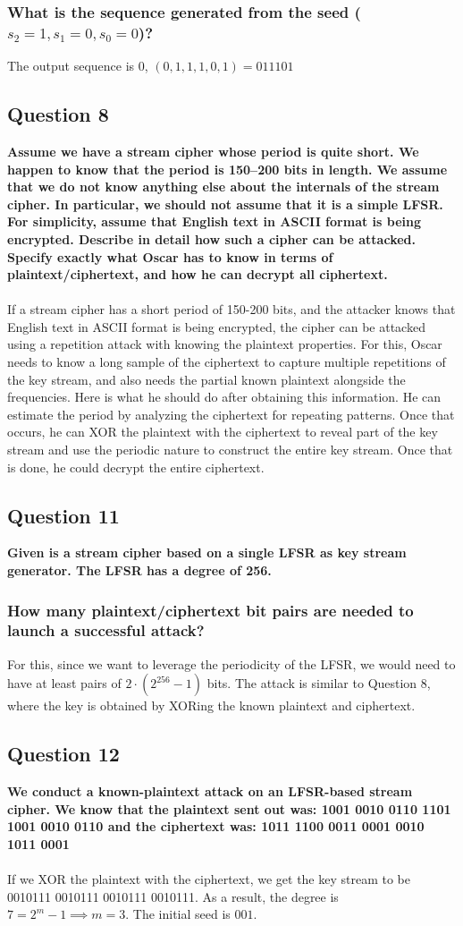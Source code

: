 \documentclass[titlepage]{article}
\begin{document}
{{\subsubsection{What is the sequence generated from the seed (\(s_2 = 1, s_1 = 0, s_0 = 0\))?}
{
The output sequence is 0, \((0, 1, 1, 1, 0, 1) = 011101\)
}
}
\subsection{Question 8}
{
\textbf{Assume we have a stream cipher whose period is quite short. We happen to know that the period is 150–200 bits in length. We assume that we do not know anything else about the internals of the stream cipher. In particular, we should not assume that it is a simple LFSR. For simplicity, assume that English text in ASCII format is being encrypted. Describe in detail how such a cipher can be attacked. Specify exactly what Oscar has to know in terms of plaintext/ciphertext, and how he can decrypt all ciphertext.}\\\\
If a stream cipher has a short period of 150-200 bits, and the attacker knows that English text in ASCII format is being encrypted, the cipher can be attacked using a repetition attack with knowing the plaintext properties. For this, Oscar needs to know a long sample of the ciphertext to capture multiple repetitions of the key stream, and also needs the partial known plaintext alongside the frequencies. Here is what he should do after obtaining this information. He can estimate the period by analyzing the ciphertext for repeating patterns. Once that occurs, he can XOR the plaintext with the ciphertext to reveal part of the key stream and use the periodic nature to construct the entire key stream. Once that is done, he could decrypt the entire ciphertext.
}
\clearpage
\subsection{Question 11}
{
\textbf{Given is a stream cipher based on a single LFSR as key stream generator. The LFSR has a degree of 256.}
\subsubsection{How many plaintext/ciphertext bit pairs are needed to launch a successful attack?}
{
For this, since we want to leverage the periodicity of the LFSR, we would need to have at least pairs of \(2 \cdot (2^{256} - 1)\) bits. 
}
The attack is similar to Question 8, where the key is obtained by XORing the known plaintext and ciphertext.
}
\subsection{Question 12}
{
\textbf{We conduct a known-plaintext attack on an LFSR-based stream cipher. We know that the plaintext sent out was: 1001 0010 0110 1101 1001 0010 0110 and the ciphertext was: 1011 1100 0011 0001 0010 1011 0001}\\\\
If we XOR the plaintext with the ciphertext, we get the key stream to be 0010111 0010111 0010111 0010111. As a result, the degree is \(7 = 2^m - 1 \implies m = 3\). The initial seed is \(001\). 
}
}
\clearpage
\end{document}
